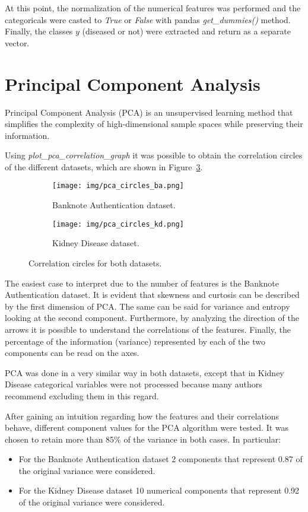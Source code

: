 \documentclass[11pt,a4paper]{article}
\begin{document}
At this point, the normalization of the numerical features was performed and the categoricals were casted to \textit{True} or \textit{False} with pandas \textit{get\_dummies()} method. Finally, the classes $y$ (diseased or not) were extracted and return as a separate vector.

\section{Principal Component Analysis}

Principal Component Analysis (PCA) is an unsupervised learning method that simplifies the complexity of high-dimensional sample spaces while preserving their information.

Using \textit{plot\_pca\_correlation\_graph} it was possible to obtain the correlation circles of the different datasets, which are shown in Figure~\ref{pca_circles}.

\begin{figure}[h]
\centering
\begin{subfigure}{.5\textwidth}
  \centering
  \texttt{[image: img/pca\_circles\_ba.png]}
  \caption{Banknote Authentication dataset.}
  \label{fig:sub1}
\end{subfigure}%
\begin{subfigure}{.5\textwidth}
  \centering
  \texttt{[image: img/pca\_circles\_kd.png]}
  \caption{Kidney Disease dataset.}
  \label{fig:sub2}
\end{subfigure}
\caption{Correlation circles for both datasets.}
\label{pca_circles}
\end{figure}

The easiest case to interpret due to the number of features is the Banknote Authentication dataset. It is evident that skewness and curtosis can be described by the first dimension of PCA. The same can be said for variance and entropy looking at the second component. Furthermore, by analyzing the direction of the arrows it is possible to understand the correlations of the features. Finally, the percentage of the information (variance) represented by each of the two components can be read on the axes.

PCA was done in a very similar way in both datasets, except that in Kidney Disease categorical variables were not processed because many authors recommend excluding them in this regard.

After gaining an intuition regarding how the features and their correlations behave, different component values for the PCA algorithm were tested. It was chosen to retain more than 85\% of the variance in both cases. In particular:
\begin{itemize}
  \item For the Banknote Authentication dataset 2 components that represent 0.87 of the original variance were considered.
  \item For the Kidney Disease dataset 10 numerical components that represent 0.92 of the original variance were considered.
\end{itemize}
\end{document}
